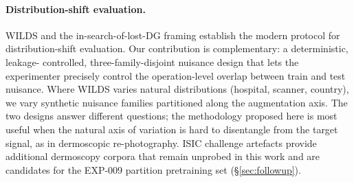 \paragraph{Distribution-shift evaluation.}
WILDS \citep{koh2021wilds} and the in-search-of-lost-DG framing
\citep{gulrajani2021dg} establish the modern protocol for distribution-shift
evaluation. Our contribution is complementary: a deterministic, leakage-
controlled, three-family-disjoint nuisance design that lets the experimenter
precisely control the operation-level overlap between train and test nuisance.
Where WILDS varies natural distributions (hospital, scanner, country), we vary
synthetic nuisance families partitioned along the augmentation axis. The two
designs answer different questions; the methodology proposed here is most
useful when the natural axis of variation is hard to disentangle from the
target signal, as in dermoscopic re-photography. ISIC challenge artefacts
\citep{codella2018isic, combalia2019bcn20000} provide additional dermoscopy
corpora that remain unprobed in this work and are candidates for the EXP-009
partition pretraining set (\S\ref{sec:followup}).
